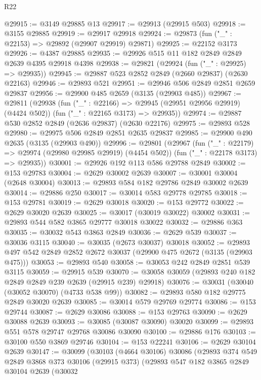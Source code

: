 \begin{lexlean}{R22}
\begin{coremodule}
@29915 := @3149 @29885 @13
@29917 := @29913 (@29915 @503)
@29918 := @3155 @29885
@29919 := @29917 @29918
@29924 := @29873 (fun ("_" : @22153) => @29892 (@29907 @29919) @29871)
@29925 := @22152 @3173
@29926 := @4387 @29885
@29935 := @29926 @515 @11 @182 @2849 @2849 @2639 @4395 @29918 @4398
@29938 := @29821 (@29924 (fun ("_" : @29925) => @29935))
@29945 := @29887 @523 @2852 @2849 (@2660 @29837) (@2630 @22163)
@29946 := @29893 @521
@29951 := @29946 @506 @2849 @2851 @2659 @29837
@29956 := @29900 @485 @2659 (@3135 (@29903 @485))
@29967 := @29811
    (@29938
      (fun ("_" : @22166) => @29945 (@29951 @29956 @29919) (@4424 @502))
      (fun ("_" : @22165 @3173) => @29935))
@29974 := @29887 @530 @2852 @2849 (@2636 @29837) (@2630 @22176)
@29975 := @29893 @528
@29980 := @29975 @506 @2849 @2851 @2635 @29837
@29985 := @29900 @490 @2635 (@3135 (@29903 @490))
@29996 := @29801
    (@29967
      (fun ("_" : @22179) => @29974 (@29980 @29985 @29919) (@4454 @502))
      (fun ("_" : @22178 @3173) => @29935))
@30001 := @29926 @192 @113 @586 @29788 @2849
@30002 := @153 @29783
@30004 := @2629 @30002 @2639
@30007 := @30001 @30004 (@2648 @30004)
@30013 := @29893 @584 @182 @29786 @2849 @30002 @2639
@30014 := @29886 @250
@30017 := @30014 @583 @29778 @29785
@30018 := @153 @29781
@30019 := @2629 @30018
@30020 := @153 @29772
@30022 := @2629 @30020 @2639
@30025 := @30017 (@30019 @30022) @30002
@30031 := @29893 @544 @582 @3865 @29777 @30018 @30022
@30032 := @29886 @363
@30035 := @30032 @543 @3863 @2849
@30036 := @2629 @539
@30037 := @30036 @3115
@30040 := @30035 (@2673 @30037) @30018
@30052 := @29893 @497 @542 @2849 @2852 @2672 @30037 (@29900 @475 @2672 (@3135 (@29903 @475)))
@30053 := @29893 @540
@30058 := @30053 @242 @2849 @2851 @539 @3115
@30059 := @29915 @539
@30070 := @30058 @30059 (@29893 @240 @182 @2849 @2849 @239 @2639 (@29915 @239) @29918)
@30076 := @30031 (@30040 (@30052 @30070) (@4733 @538 @99))
@30082 := @29893 @580 @182 @29775 @2849 @30020 @2639
@30085 := @30014 @579 @29769 @29774
@30086 := @153 @29744
@30087 := @2629 @30086
@30088 := @153 @29763
@30090 := @2629 @30088 @2639
@30093 := @30085 (@30087 @30090) @30020
@30099 := @29893 @551 @578 @29747 @29768 @30086 @30090
@30100 := @29886 @176
@30103 := @30100 @550 @3869 @29746
@30104 := @153 @22241
@30106 := @2629 @30104 @2639
@30147 := @30099
    (@30103
      (@4664 @30106)
      @30086
      (@29893
        @374
        @549
        @2849
        @3868
        @373
        @30106
        (@29915 @373)
        (@29893
          @547
          @182
          @3865
          @2849
          @30104
          @2639
          (@30032

\end{coremodule}
\end{lexlean}
